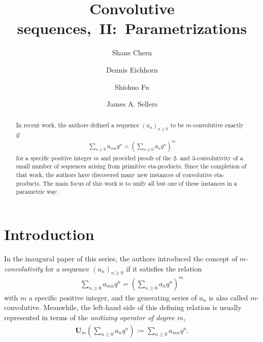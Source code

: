 \documentclass[12pt,reqno]{amsart}
\title[Convolutive sequences,~II]{Convolutive sequences,~II:~Parametrizations}
\author[S. Chern]{Shane Chern}
\author[D. Eichhorn]{Dennis Eichhorn}
\author[S. Fu]{Shishuo Fu}
\author[J. A. Sellers]{James A. Sellers}
\date{}
\numberwithin{equation}{section}
\theoremstyle{plain}
\theoremstyle{definition}
\theoremstyle{named}
\newcommand{\UU}{\mathbf{U}}
\begin{document}
	
\sloppy

\begin{abstract}
	In recent work, the authors defined a sequence $(a_n)_{n\ge 0}$ to be $m$-convolutive exactly if 
	\begin{align*}
		\sum_{n\ge 0} a_{mn} q^n = \left(\sum_{n\ge 0} a_n q^n\right)^m
	\end{align*}
	for a specific positive integer $m$ and provided proofs of the $2$- and $3$-convolutivity of a small number of sequences arising from primitive eta-products. Since the completion of that work, the authors have discovered many new instances of convolutive eta-products. The main focus of this work is to unify all but one of these instances in a parametric way.
    
    
\end{abstract}

\maketitle

\section{Introduction}
\label{sec:intro}

In the inaugural paper of this series, the authors introduced the concept of \emph{$m$-convolutivity} for a sequence $(a_n)_{n\ge 0}$ if it satisfies the relation~\cite[Definition~1.1]{CEFS1}
\begin{align}\label{def:m-conv}
	\sum_{n\ge 0} a_{mn} q^n = \left(\sum_{n\ge 0} a_n q^n\right)^m
\end{align}
with $m$ a specific positive integer, and the generating series of $a_n$ is also called $m$-convolutive. Meanwhile, the left-hand side of this defining relation is usually represented in terms of the \emph{unitizing operator of degree $m$},
\begin{align*}
	\UU_m\left(\sum_{n\ge 0} a_n q^n\right) := \sum_{n\ge 0} a_{mn} q^n.
\end{align*}
\end{document}
